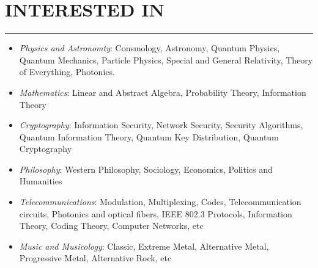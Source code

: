 \documentclass[10pt,a4paper]{article}
\begin{document}

\section{INTERESTED IN}
\noindent \rule {3.2cm}{0.4pt}
  \begin{itemize}
    \setlength{\rightskip}{2cm}
    \setlength\itemsep{0em}
    \item \small \textit{Physics and Astronomty}: Consmology, Astronomy, Quantum Physics, Quantum Mechanics, Particle Physics, Special and General Relativity, Theory of Everything, Photonics.
    \item \small \textit{Mathematics}: Linear and Abstract Algebra, Probability Theory, Information Theory
  	\item \small \textit{Cryptography}: Information Security, Network Security, Security Algorithms, Quantum Information Theory, Quantum Key Distribution, Quantum Cryptography 
	\item \small \textit{Philosophy}: Western Philosophy, Sociology, Economics, Politics and Humanities
	\item \small \textit{Telecommunications}: Modulation, Multiplexing, Codes, Telecommunication circuits, Photonics and optical fibers, IEEE 802.3 Protocols, Information Theory, Coding Theory, Computer Networks, etc 
    \item \small \textit{Music and Musicology}: Classic, Extreme Metal, Alternative Metal, Progressive Metal, Alternative Rock, etc
  \end{itemize}
\end{document}
